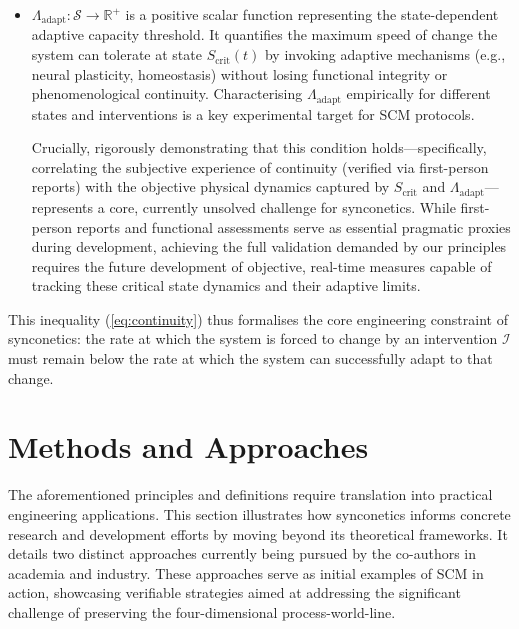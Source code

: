 \documentclass[10pt]{article}
\begin{document}
\begin{sloppypar}
\begin{itemize}
\begin{itemize}
            \item \( \Lambda_{\text{adapt}}: \mathcal{S} \to \mathbb{R}^+ \) is a positive scalar function representing the state-dependent adaptive capacity threshold. It quantifies the maximum speed of change the system can tolerate at state \( S_{\text{crit}}(t) \) by invoking adaptive mechanisms (e.g., neural plasticity, homeostasis) without losing functional integrity or phenomenological continuity. Characterising \( \Lambda_{\text{adapt}} \) empirically for different states and interventions is a key experimental target for SCM protocols.

                  Crucially, rigorously demonstrating that this condition holds—specifically, correlating the subjective experience of continuity (verified via first-person reports) with the objective physical dynamics captured by \(S_{\text{crit}}\) and \( \Lambda_{\text{adapt}} \)—represents a core, currently unsolved challenge for synconetics. While first-person reports and functional assessments serve as essential pragmatic proxies during development, achieving the full validation demanded by our principles requires the future development of objective, real-time measures capable of tracking these critical state dynamics and their adaptive limits.
          \end{itemize}

          This inequality (\autoref{eq:continuity}) thus formalises the core engineering constraint of synconetics: the rate at which the system is forced to change by an intervention \( \mathcal{I} \) must remain below the rate at which the system can successfully adapt to that change.
  \end{itemize}


  \section{Methods and Approaches}
  \label{sec:methods}

  The aforementioned principles and definitions require translation into practical engineering applications. This section illustrates how synconetics informs concrete research and development efforts by moving beyond its theoretical frameworks. It details two distinct approaches currently being pursued by the co-authors in academia and industry. These approaches serve as initial examples of SCM in action, showcasing verifiable strategies aimed at addressing the significant challenge of preserving the four-dimensional process-world-line.


\end{sloppypar}
\end{document}
